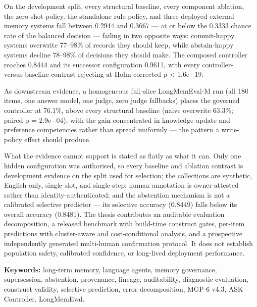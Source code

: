 On the development split, every structural baseline, every component
ablation, the zero-shot policy, the standalone rule policy, and three
deployed external memory systems fall between 0.2944 and 0.3667 --- at
or below the 0.3333 chance rate of the balanced decision --- failing in
two opposite ways: commit-happy systems overwrite 77--98\% of records
they should keep, while abstain-happy systems decline 78--98\% of
decisions they should make. The composed controller reaches 0.8444 and
its successor configuration 0.9611, with every
controller-versus-baseline contrast rejecting at Holm-corrected p
\textless{} 1.6e−19.

As downstream evidence, a homogeneous full-slice LongMemEval-M run (all
180 items, one answer model, one judge, zero judge fallbacks) places the
governed controller at 76.1\%, above every structural baseline (naive
overwrite 63.3\%; paired p = 2.9e−04), with the gain concentrated in
knowledge-update and preference competencies rather than spread
uniformly --- the pattern a write-policy effect should produce.

What the evidence cannot support is stated as flatly as what it can.
Only one hidden configuration was authorised, so every baseline and
ablation contrast is development evidence on the split used for
selection; the collections are synthetic, English-only, single-slot, and
single-step; human annotation is owner-attested rather than
identity-authenticated; and the abstention mechanism is not a calibrated
selective predictor --- its selective accuracy (0.8449) falls below its
overall accuracy (0.8481). The thesis contributes an auditable
evaluation decomposition, a released benchmark with build-time construct
gates, per-item predictions with cluster-aware and cost-conditional
analysis, and a prospective independently generated multi-human
confirmation protocol. It does not establish population safety,
calibrated confidence, or long-lived deployment performance.

\textbf{Keywords:} long-term memory, language agents, memory governance,
supersession, abstention, provenance, lineage, auditability, diagnostic
evaluation, construct validity, selective prediction, error
decomposition, MGP-6 v4.3, ASK Controller, LongMemEval.
